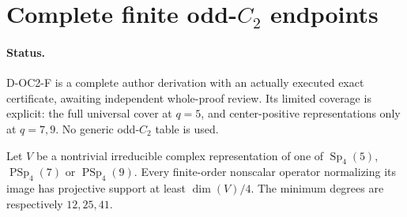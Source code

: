 \section{Complete finite odd-$C_2$ endpoints}

\paragraph{Status.}
D-OC2-F is a complete author derivation with an actually executed exact
certificate, awaiting independent whole-proof review. Its limited coverage
is explicit: the full universal cover at $q=5$, and center-positive
representations only at $q=7,9$. No generic odd-$C_2$ table is used.

\begin{lemma}
Let $V$ be a nontrivial irreducible complex representation of one of
$\operatorname{Sp}_4(5)$, $\operatorname{PSp}_4(7)$ or
$\operatorname{PSp}_4(9)$. Every finite-order nonscalar operator
normalizing its image has projective support at least $\dim(V)/4$.
The minimum degrees are respectively $12,25,41$.
\end{lemma}

